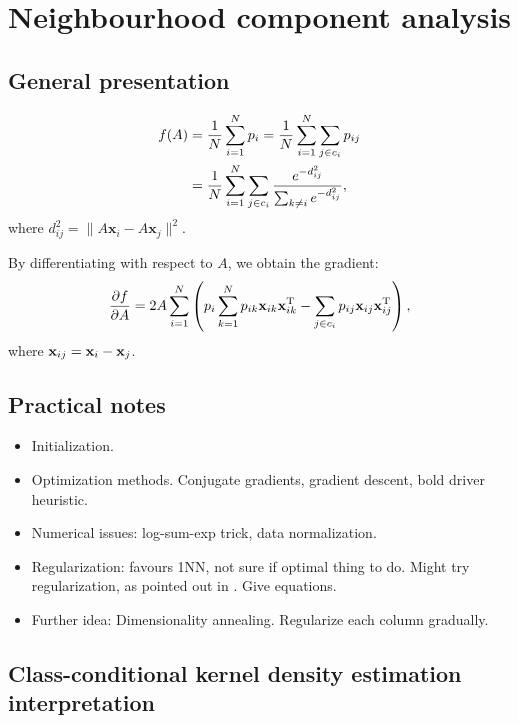 \chapter{Neighbourhood component analysis}
\label{ch:nca}

\section{General presentation}
\label{sec:general-presentation}

\begin{align}
 f(A) &= \frac{1}{N}\sum_{i=1}^Np_i=\frac{1}{N}\sum_{i=1}^N\sum_{j\in c_i}p_{ij}\notag\\
 &= \frac{1}{N}\sum_{i=1}^N\sum_{j\in c_i}\frac{e^{-d_{ij}^2}}{\sum_{k\neq i}e^{-d_{ij}^2}}\label{eq:nca-obj},
\end{align}
 where $d_{ij}^2=\lVert A\mathbf{x}_i-A\mathbf{x}_j\lVert^2$.

By differentiating with respect to $A$, we obtain the gradient:
\begin{align}
  \frac{\partial f}{\partial A}=2A\sum_{i=1}^{N}\left(p_i\sum_{k=1}^Np_{ik}\mathbf{x}_{ik}\mathbf{x}_{ik}^{\textrm{T}} - \sum_{j\in c_i}p_{ij}\mathbf{x}_{ij}\mathbf{x}_{ij}^{\textrm{T}} \right)\label{eq:nca-grad},
\end{align}
where $\mathbf{x}_{ij} = \mathbf{x}_i - \mathbf{x}_j$. 


\section{Practical notes}

\begin{itemize}
	\item Initialization.
	\item Optimization methods. Conjugate gradients, gradient descent, bold driver heuristic. 
	\item Numerical issues: log-sum-exp trick, data normalization.
	\item Regularization: favours 1NN, not sure if optimal thing to do. Might try regularization, as pointed out in \citep{singh2010}. Give equations.
	\item Further idea: Dimensionality annealing. Regularize each column gradually.
\end{itemize}

\section{Class-conditional kernel density estimation interpretation}
\label{sec:cc-kde}

